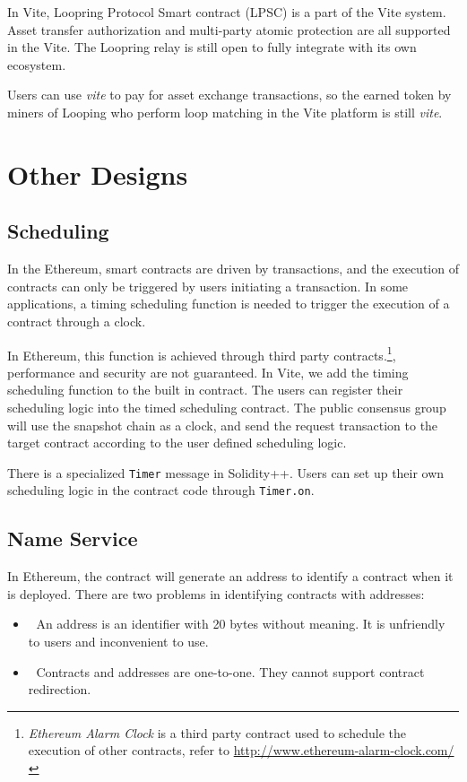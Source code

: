 \documentclass[UTF8,nofonts]{article}
\begin{document}
\begin{multicols}{2}
In Vite, Loopring Protocol Smart contract (LPSC) is a part of the Vite system. Asset transfer authorization and multi-party atomic protection are all supported in the Vite. The Loopring relay is still open to fully integrate with its own ecosystem.

Users can use \textit{vite} to pay for asset exchange transactions, so the earned token by miners of Looping who perform loop matching in the Vite platform is still \textit{vite}.


\section{Other Designs}
\subsection{Scheduling}
In the Ethereum, smart contracts are driven by transactions, and the execution of contracts can only be triggered by users initiating a transaction. In some applications, a timing scheduling function is needed to trigger the execution of a contract through a clock.

In Ethereum, this function is achieved through third party contracts.\footnote{\textit{Ethereum Alarm Clock} is a third party contract used to schedule the execution of other contracts, refer to \url{http://www.ethereum-alarm-clock.com/}}, performance and security are not guaranteed. In Vite, we add the timing scheduling function to the built in contract. The users can register their scheduling logic into the timed scheduling contract. The public consensus group will use the snapshot chain as a clock, and send the request transaction to the target contract according to the user defined scheduling logic.

There is a specialized \texttt{Timer} message in Solidity++. Users can set up their own scheduling logic in the contract code through \texttt{Timer.on}.

\subsection{Name Service}\label{sec:vns}
In Ethereum, the contract will generate an address to identify a contract when it is deployed. There are two problems in identifying contracts with addresses:
\begin{itemize}
	\item 	An address is an identifier with 20 bytes without meaning. It is unfriendly to users and inconvenient to use.
	\item 	Contracts and addresses are one-to-one. They cannot support contract redirection.
\end{itemize}


\end{multicols}
\end{document}
